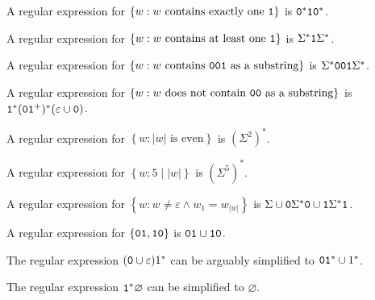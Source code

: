 \documentclass{notes}
\begin{document}
\begin{eg}
  A regular expression for $\left \{ w : \text{$w$ contains exactly one \verb~1~} \right \}$ is $\verb~0~^* \verb~1~ \verb~0~^*$.
\end{eg}

\begin{eg}
  A regular expression for $\left \{ w : \text{$w$ contains at least one \verb~1~} \right \}$ is $\Sigma^* \verb~1~ \Sigma^*$.
\end{eg}

\begin{eg}
  A regular expression for $\left \{ w : \text{$w$ contains \verb~001~ as a substring} \right \}$ is $\Sigma^* \verb~001~ \Sigma^*$.
\end{eg}

\begin{eg}
  A regular expression for $\left \{ w : \text{$w$ does not contain \verb~00~ as a substring} \right \}$ is $\verb~1~^* (\verb~0~ \verb~1~^+)^* (\varepsilon \cup \verb~0~)$.
\end{eg}

\begin{eg}
  A regular expression for $\left \{ w : \text{$|w|$ is even} \right \}$ is $(\Sigma^2)^*$.
\end{eg}

\begin{eg}
  A regular expression for $\left \{ w : 5 \mid |w| \right \}$ is $(\Sigma^5)^*$.
\end{eg}

\begin{eg}
  A regular expression for $\left \{ w : w \neq \varepsilon \land w_1 = w_{|w|} \right \}$ is $\Sigma \cup \verb~0~ \Sigma^* \verb~0~ \cup \verb~1~ \Sigma^* \verb~1~$.
\end{eg}

\begin{eg}
  A regular expression for $\left \{ \verb~01~, \verb~10~ \right \}$ is $\verb~01~ \cup \verb~10~$.
\end{eg}

\begin{eg}
  The regular expression $(\verb~0~ \cup \varepsilon) 1^*$ can be arguably simplified to $\verb~01~^* \cup 1^*$.
\end{eg}

\begin{eg}
  The regular expression $\verb~1~^* \varnothing$ can be simplified to $\varnothing$.
\end{eg}
\end{document}
